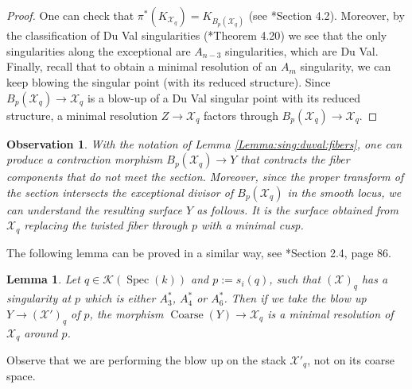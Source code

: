 \documentclass[11pt]{amsart}
\newcommand{\sX}{\mathscr{X}}
\newcommand{\spec}{\operatorname{Spec}}
\newcommand{\Kg}{\mathcal{K}}
\newtheorem{Lemma}[theorem]{Lemma}
\newtheorem{Oss}[theorem]{Observation}
\theoremstyle{definition}
\begin{document}
\begin{proof}
One can check that $\pi^*(K_{\sX_q})=K_{B_p(\sX_q)}$ (see \cite{KM}*{Section 4.2}).
Moreover, by the classification of Du Val singularities (\cite{KM}*{Theorem 4.20}) we see that the only singularities along the exceptional are
$A_{n-3}$ singularities,
which are Du Val. Finally, recall that to obtain a minimal resolution of an $A_m$ singularity, we can keep blowing the singular point
(with its reduced structure). Since $B_p(\sX_q) \to \sX_q$ is a blow-up of a Du Val singular point with its reduced structure, a minimal resolution
$Z \to \sX_q$ factors through $B_p(\sX_q) \to \sX_q$.
\end{proof}
\begin{Oss}\label{Oss:contract:intermediate:duval}
 With the notation of Lemma \ref{Lemma:sing:duval:fibers}, one can produce a contraction morphism $B_p(\sX_q) \to Y$ that contracts the fiber components that do not meet the section.
 Moreover, since the proper transform of the section intersects the exceptional divisor of $B_p(\sX_q)$ in the smooth locus,
 we can understand the resulting surface $Y$ as follows. It is the surface obtained from $\sX_q$ replacing the twisted fiber through $p$ with a
 minimal cusp.
\end{Oss}
The following lemma can be proved in a similar way, see \cite{Kollarresol}*{Section 2.4, page 86}.
\begin{Lemma}\label{Lemma:sing:nonduval:fibers}
 Let $q \in \Kg(\spec(k))$ and $p:=s_i(q)$, such that $(\sX)_q$ has a singularity at $p$ which is either
 $A_3^*$, $A_4^*$ or $A_6^*$. 
 Then if we take the blow up $Y \to (\sX')_q$ of $p$, the morphism $\operatorname{Coarse}(Y) \to \sX_q$ is a minimal resolution of $\sX_q$ around $p$.
\end{Lemma}
Observe that we are performing the blow up on the stack $\sX'_q$, not on its coarse space.
\end{document}
